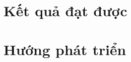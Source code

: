 \documentclass[../thesis.tex]{subfiles}
\begin{document}
\section{Kết quả đạt được}

\section{Hướng phát triển}
\end{document}

